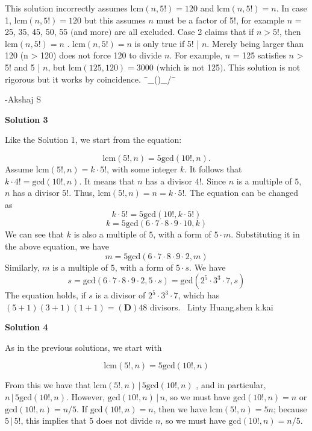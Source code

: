 \begin{enumerate}
 
This solution incorrectly assumes  \( \text{lcm}(n, 5!) = 120  \) and  \( \text{lcm}(n, 5!) = n \). In case 1, \( \text{lcm}(n, 5!) = 120  \) but this assumes \( n \) must be a factor of 5!, for example \( n \) = 25, 35, 45, 50, 55 $($and more$)$ are all excluded. Case 2 claims that if \(n > 5!\), then \( \text{lcm}(n, 5!) = n \) . \( \text{lcm}(n, 5!) = n \) is only true if 5! | \( n \). Merely being larger than 120 (n > 120) does not force 120 to divide \( n \). For example, \( n \) = 125 satisfies \( n \) > 5! and 5 | \( n \), but \( \text{lcm}(125, 120) = 3000 \) $($which is not 125$)$. This solution is not rigorous but it works by coincidence. ¯\_()\_/¯

 -Akshaj S

 



\textbf{Solution 3}

Like the Solution 1, we start from the equation:

 
 \[\text{lcm}{(5!, n)} = 5\text{gcd}{(10!, n)}.\]Assume $\text{lcm}{(5!, n)}=k\cdot5!$, with some integer $k$. It follows that $k\cdot 4!=\text{gcd}{(10!, n)}$. It means that $n$ has a divisor $4!$. Since $n$ is a multiple of $5$, $n$ has a divisor $5!$. Thus, $\text{lcm}{(5!, n)}=n=k\cdot5!$. The equation can be changed as
 \[k\cdot5!=5\text{gcd}{(10!, k\cdot5!)}\]
 \[k=5\text{gcd}{(6\cdot7\cdot8\cdot9\cdot10, k)}\]We can see that $k$ is also a multiple of $5$, with a form of $5\cdot m$. Substituting it in the above equation, we have
 \[m=5\text{gcd}{(6\cdot7\cdot8\cdot9\cdot2, m)}\]Similarly, $m$ is a multiple of $5$, with a form of $5\cdot s$. We have 
 \[s=\text{gcd}{(6\cdot7\cdot8\cdot9\cdot2, 5\cdot s)}=\text{gcd}{(2^5\cdot3^3\cdot7, s)}\]The equation holds, if $s$ is a divisor of $2^5\cdot3^3\cdot7$, which has $(5+1)(3+1)(1+1)=\boxed{(\textbf{D})48}$ divisors. ~Linty Huang.shen k.kai

 



\textbf{Solution 4}

As in the previous solutions, we start with

 
 \[\text{lcm}(5!,n) = 5\text{gcd}(10!,n)\]

 From this we have that $\text{lcm}(5!,n) \,|\, 5\text{gcd}(10!,n)$ , and in particular, $n \,|\, 5\text{gcd}(10!,n)$. However, $\text{gcd}(10!,n)\, |\, n$, so we must have $\text{gcd}(10!,n) = n$ or $\text{gcd}(10!,n) = n/5$. If $\text{gcd}(10!,n) = n$, then we have $\text{lcm}(5!,n) = 5n$; because $5\, |\, 5!$, this implies that 5 does not divide $n$, so we must have $\text{gcd}(10!,n) = n/5$.


\end{enumerate}
